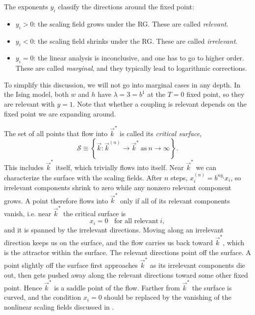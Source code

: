 The exponents $y_i$ classify the directions around the fixed point:
\begin{itemize}
\item $y_i>0$: the scaling field grows under the RG. These are called
{\it relevant}.
\item $y_i<0$: the scaling field shrinks under the RG. These are called
{\it irrelevant}.
\item $y_i=0$: the linear analysis is inconclusive, and one has to go to higher
order. These are called {\it marginal}, and they typically lead
to logarithmic corrections.
\end{itemize}
To simplify this discussion, we will not go into marginal cases in any depth.
In the  Ising model, both $w$ and $h$ have $\lambda=3=b^1$ at the $T=0$
fixed point, so they are relevant with $y=1$. Note that whether a coupling is
relevant depends on the fixed point we are expanding around.

The set of all points that flow into $\vec{k}^*$ is called its
{\it critical surface},
\begin{equation}
  \mathcal{S}\equiv\left\{\vec{k}:\vec{k}^{(n)}\to\vec{k}^*~\text{as}~n\to\infty\right\}.
\end{equation}
This includes $\vec{k}^*$ itself,
which trivially flows into itself. Near $\vec{k}^*$ we can characterize the
surface with the scaling fields. After $n$ steps, $x_i^{(n)}=b^{ny_i}x_i$, so
irrelevant components shrink to zero while any nonzero relevant component
grows. A point therefore flows into $\vec{k}^*$ only if all of its relevant
components vanish, i.e. near $\vec{k}^*$ the critical surface is
\begin{equation}\label{eq:critSurfaceLinear}
  x_i=0~~~~\text{for all relevant}~i,
\end{equation}
and it is spanned by the irrelevant directions. Moving along an irrelevant
direction keeps us on the surface, and the flow carries us back toward
$\vec{k}^*$, which is the attractor within the surface. The relevant directions
point off the surface. A point slightly off the surface first approaches
$\vec{k}^*$ as its irrelevant components die out, then gets pushed away along
the relevant directions toward some other fixed point. Hence $\vec{k}^*$ is a
saddle point of the flow. Farther from $\vec{k}^*$ the surface is curved, and
the condition $x_i=0$ should be replaced by the vanishing of the nonlinear
scaling fields discussed in .

